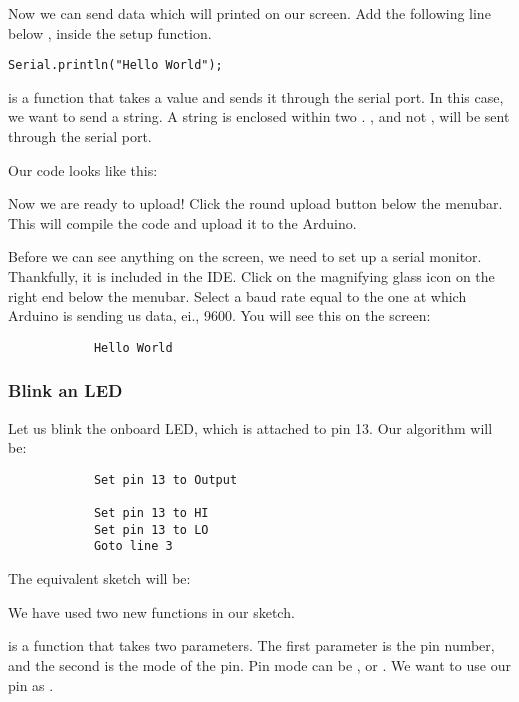 \documentclass{article}
\begin{document}
			Now we can send data which will printed on our screen. Add the following line below , inside the setup function.

			\begin{lstlisting}[firstnumber = 4]
			Serial.println("Hello World");
			\end{lstlisting}

			 is a function that takes a value and sends it through the serial port. In this case, we want to send a string. A string is enclosed within two . , and not , will be sent through the serial port.

			Our code looks like this:

			

			Now we are ready to upload! Click the round upload button below the menubar. This will compile the code and upload it to the Arduino.

			Before we can see anything on the screen, we need to set up a serial monitor. Thankfully, it is included in the IDE. Click on the magnifying glass icon on the right end below the menubar. Select a baud rate equal to the one at which Arduino is sending us data, ei., 9600. You will see this on the screen:

			\begin{lstlisting}
			Hello World
			\end{lstlisting}

		\subsubsection{Blink an LED}

			Let us blink the onboard LED, which is attached to pin 13. Our algorithm will be:

			\begin{lstlisting}
			Set pin 13 to Output

			Set pin 13 to HI
			Set pin 13 to LO
			Goto line 3
			\end{lstlisting}

			The equivalent sketch will be:

			

			We have used two new functions in our sketch.

			 is a function that takes two parameters. The first parameter is the pin number, and the second is the mode of the pin. Pin mode can be  ,  or . We want to use our pin as .
\end{document}
